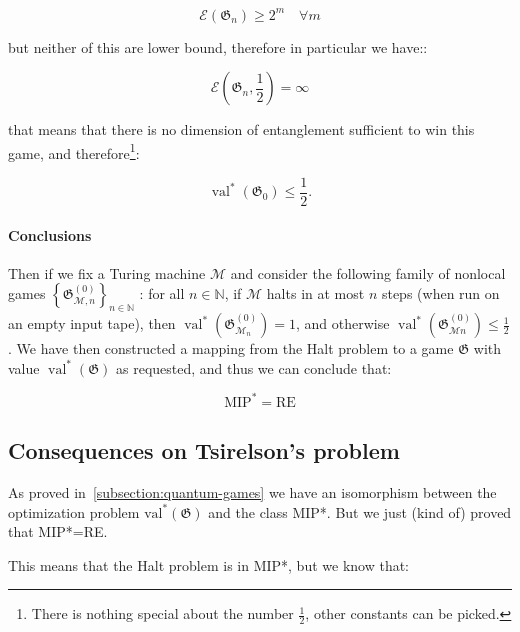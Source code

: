 \begin{equation}
    \mathscr{E}\left(\mathfrak{G}_{n}\right) \geq 2^m \quad \forall m
\end{equation}

but neither of this are lower bound, therefore in particular we have::

\begin{equation}
    \mathscr{E}\left(\mathfrak{G}_{n}, \frac{1}{2}\right) = \infty
\end{equation}

that means that there is no dimension of entanglement sufficient to win this game, and therefore\footnote{There is nothing special about the number $\frac{1}{2}$, other constants can be picked.}:

\begin{equation}
    \operatorname{val}^{*}(\mathfrak{G}_0) \leq \frac{1}{2}.
\end{equation}
\paragraph{Conclusions}
Then if we fix a Turing machine $\mathcal{M}$ and consider the following family of nonlocal games $\left\{\mathfrak{G}_{\mathcal{M}, n}^{(0)}\right\}_{n \in \mathbb{N}}$ : for all $n \in \mathbb{N}$, if $\mathcal{M}$ halts in at most $n$ steps (when run on an empty input tape), then $\operatorname{val}^{*}\left(\mathfrak{G}_{\mathcal{M}_{n}}^{(0)}\right)=1$, and otherwise $\operatorname{val}^{*}\left(\mathfrak{G}_{\mathcal{M} n}^{(0)}\right) \leq \frac{1}{2}$.
We have then constructed a mapping from the Halt problem to a game $\mathfrak{G}$ with value $\operatorname{val}^{*}(\mathfrak{G})$ as requested, and thus we can conclude that:
\begin{theorem}
\begin{equation}
\text{MIP}^{*} = \text{RE}
\end{equation}
\end{theorem}

\subsection{Consequences on Tsirelson's problem}
As proved in~\ref{subsection:quantum-games} we have an isomorphism between the optimization problem $\operatorname{val^{*}}(\mathfrak{G})$ and the class MIP*. But we just (kind of) proved that MIP*=RE.

This means that the Halt problem is in MIP*, but we know that:

